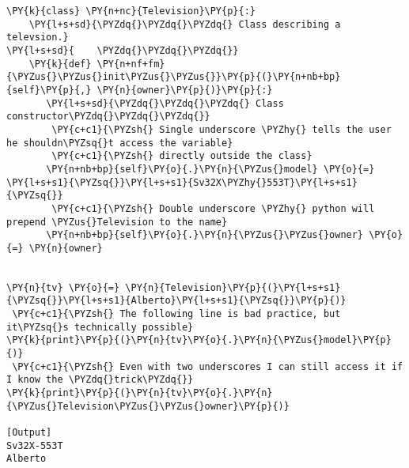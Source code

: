 \begin{Verbatim}[label=\makebox{\url{https://bitbucket.org/lbaldini/programming/src/tip/snippets/class\_tv\_private.py}},commandchars=\\\{\}]
\PY{k}{class} \PY{n+nc}{Television}\PY{p}{:}
    \PY{l+s+sd}{\PYZdq{}\PYZdq{}\PYZdq{} Class describing a televsion.}
\PY{l+s+sd}{    \PYZdq{}\PYZdq{}\PYZdq{}}
    \PY{k}{def} \PY{n+nf+fm}{\PYZus{}\PYZus{}init\PYZus{}\PYZus{}}\PY{p}{(}\PY{n+nb+bp}{self}\PY{p}{,} \PY{n}{owner}\PY{p}{)}\PY{p}{:}
       \PY{l+s+sd}{\PYZdq{}\PYZdq{}\PYZdq{} Class constructor\PYZdq{}\PYZdq{}\PYZdq{}}
        \PY{c+c1}{\PYZsh{} Single underscore \PYZhy{} tells the user he shouldn\PYZsq{}t access the variable}
        \PY{c+c1}{\PYZsh{} directly outside the class}
       \PY{n+nb+bp}{self}\PY{o}{.}\PY{n}{\PYZus{}model} \PY{o}{=} \PY{l+s+s1}{\PYZsq{}}\PY{l+s+s1}{Sv32X\PYZhy{}553T}\PY{l+s+s1}{\PYZsq{}}
        \PY{c+c1}{\PYZsh{} Double underscore \PYZhy{} python will prepend \PYZus{}Television to the name}
       \PY{n+nb+bp}{self}\PY{o}{.}\PY{n}{\PYZus{}\PYZus{}owner} \PY{o}{=} \PY{n}{owner}
    

\PY{n}{tv} \PY{o}{=} \PY{n}{Television}\PY{p}{(}\PY{l+s+s1}{\PYZsq{}}\PY{l+s+s1}{Alberto}\PY{l+s+s1}{\PYZsq{}}\PY{p}{)}
 \PY{c+c1}{\PYZsh{} The following line is bad practice, but it\PYZsq{}s technically possible}
\PY{k}{print}\PY{p}{(}\PY{n}{tv}\PY{o}{.}\PY{n}{\PYZus{}model}\PY{p}{)}
 \PY{c+c1}{\PYZsh{} Even with two underscores I can still access it if I know the \PYZdq{}trick\PYZdq{}}
\PY{k}{print}\PY{p}{(}\PY{n}{tv}\PY{o}{.}\PY{n}{\PYZus{}Television\PYZus{}\PYZus{}owner}\PY{p}{)}

[Output]
Sv32X-553T
Alberto
\end{Verbatim}